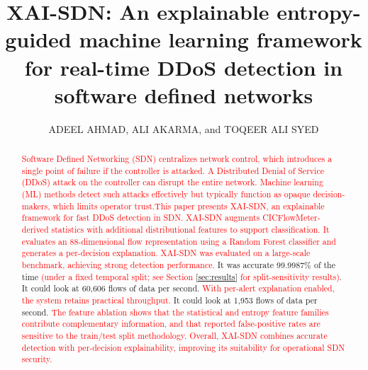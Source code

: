\documentclass{ieeeaccess}
\begin{document}



\title{XAI-SDN: An explainable entropy-guided machine learning framework for real-time DDoS detection in software defined networks}

\author{\uppercase{Adeel Ahmad},
\uppercase{Ali Akarma}, and \uppercase{Toqeer Ali Syed}}

\address[1]{AI Center, Faculty of Computer and Information Systems, Islamic University of Madinah, Madinah 42351, Saudi Arabia}
\address[2]{AI V\&V Lab, King Fahd University of Petroleum and Minerals, Dhahran, Saudi Arabia}


\begin{abstract}
\textcolor{red}{Software Defined Networking (SDN) centralizes network control, which introduces a single point of failure if the controller is attacked.} \textcolor{red}{A Distributed Denial of Service (DDoS) attack on the controller can disrupt the entire network.} \textcolor{red}{Machine learning (ML) methods detect such attacks effectively but typically function as opaque decision-makers, which limits operator trust.}\textcolor{red}{This paper presents XAI-SDN, an explainable framework for fast DDoS detection in SDN.} \textcolor{red}{XAI-SDN augments CICFlowMeter-derived statistics with additional distributional features to support classification.} \textcolor{red}{It evaluates an 88-dimensional flow representation using a Random Forest classifier and generates a per-decision explanation.}
\textcolor{red}{XAI-SDN was evaluated on a large-scale benchmark, achieving strong detection performance.} It was accurate 99.9987\% of the time \textcolor{red}{(under a fixed temporal split; see Section \ref{sec:results} for split-sensitivity results)}. It could look at 60,606 flows of data per second. \textcolor{red}{With per-alert explanation enabled, the system retains practical throughput.} It could look at 1,953 flows of data per second. \textcolor{red}{The feature ablation shows that the statistical and entropy feature families contribute complementary information, and that reported false-positive rates are sensitive to the train/test split methodology.} \textcolor{red}{Overall, XAI-SDN combines accurate detection with per-decision explainability, improving its suitability for operational SDN security.}
\end{abstract}
\end{document}
